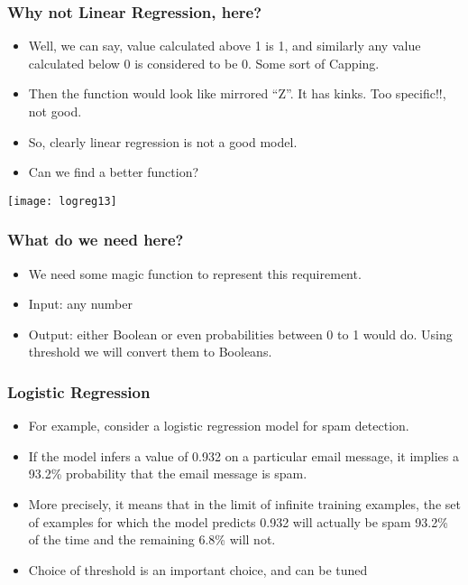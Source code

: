 \begin{frame}[fragile]\frametitle{Why not Linear Regression, here?}
\begin{itemize}
\item Well, we can say, value calculated above 1 is 1, and similarly any value calculated below 0 is considered to be 0. Some sort of Capping.
\item Then the function would look like mirrored ``Z''. It has kinks. Too specific!!, not good.
\item So, clearly linear regression is not a good model.
\item Can we find a better function?
\end{itemize}

\begin{center}
\texttt{[image: logreg13]}
\end{center}

\end{frame}


\begin{frame}[fragile]\frametitle{What do we need here?}
\begin{itemize}
\item We need some magic function to represent this requirement. 
\item Input: any number
\item Output: either Boolean or even probabilities between 0 to 1 would do. Using threshold we will convert them to Booleans.
\end{itemize}
\end{frame}

\begin{frame}[fragile]\frametitle{Logistic Regression}
\begin{itemize}
\item For example, consider a logistic regression model for spam detection. 
\item If the model infers a value of 0.932 on a particular email message, it implies a 93.2\% probability that the email message is spam. 
\item More precisely, it means that in the limit of infinite training examples, the set of examples for which the model predicts 0.932 will actually be spam 93.2\% of the time and the remaining 6.8\% will not.
\item Choice of threshold is an important choice, and can be tuned
\end{itemize}

\end{frame}


